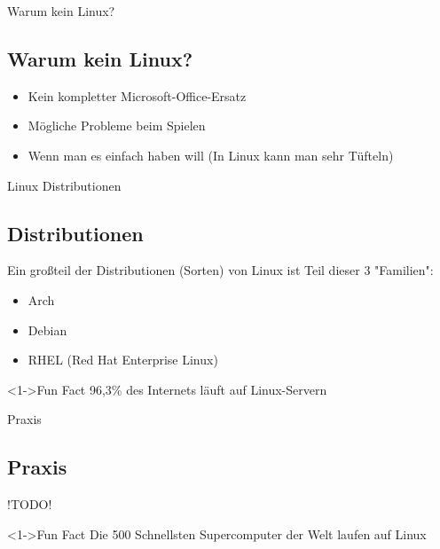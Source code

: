 \begin{frame}{Warum kein Linux?}
    \subsection{Warum kein Linux?}\label{subsec:warum-kein-linux?}

    \begin{itemize}
        \item Kein kompletter Microsoft-Office-Ersatz
        \item Mögliche Probleme beim Spielen
        \item Wenn man es einfach haben will (In Linux kann man sehr Tüfteln)
    \end{itemize}

\end{frame}

\begin{frame}{Linux Distributionen}
    \subsection{Distributionen}\label{subsec:distributionen}

    Ein großteil der Distributionen (Sorten) von Linux ist Teil dieser 3 "Familien":

    \pause

    \begin{itemize}
        \item Arch
        \item Debian
        \item RHEL (Red Hat Enterprise Linux)
    \end{itemize}

    \begin{exampleblock}<1->{Fun Fact}
        96,3\% des Internets läuft auf Linux-Servern
    \end{exampleblock}

\end{frame}

\begin{frame}{Praxis}
    \subsection{Praxis}\label{subsec:praxis}

    !TODO!

    \begin{exampleblock}<1->{Fun Fact}
        Die 500 Schnellsten Supercomputer der Welt laufen auf Linux
    \end{exampleblock}

\end{frame}